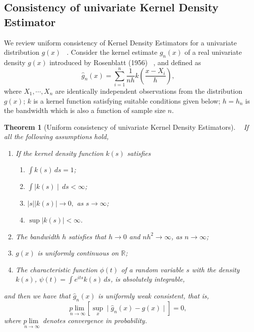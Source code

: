 \documentclass{article}
\newtheorem{theorem}{Theorem}[section]
\begin{document}
\begin{appendices}
\subsection{Consistency of univariate Kernel Density Estimator }
We review uniform consistency of Kernel Density Estimators for a univariate distribution $g(x)$ ~\cite{Silverman1978a,Pagan1999}. Consider the kernel estimate $\widehat{g}_n(x)$ of a real univariate density $g(x)$ introduced by Rosenblatt (1956) ~\cite{Silverman1978a,Pagan1999},  and defined as 
$$\widehat{g}_n(x) = \sum_{i=1}^{n} \frac{1}{nh} k\left( \frac{x-X_i}{h}\right),$$
where $X_1, \cdots, X_n$ are identically independent observations from the  distribution $g(x)$; $k$ is a kernel function satisfying suitable conditions given below; $h = h_n$ is the bandwidth which is also a function of sample size $n$.
\begin{theorem}[Uniform consistency of univariate Kernel Density Estimators]~\cite{Pagan1999,Silverman1978a}
	If all the following assumptions hold,
	\begin{enumerate}
		\item If the kernel density function $k(s)$ satisfies
		\begin{enumerate}
			\item $\int k(s)\,ds=1$;
			\item $\int \mid k(s) \mid \,ds<\infty$;
			\item $\left|s\right|\left|k(s)\right| \to 0,$ as $s \to \infty$;
			\item $\sup\left|k(s)\right|<\infty$.
		\end{enumerate}
		\item The bandwidth $h$ satisfies that $h \to 0$ and $nh^2 \to \infty$, as $n \to \infty$;
		\item $g(x)$ is uniformly continuous on $\mathbb{R}$;
		\item The characteristic function $\phi(t)$ of a random variable $s$ with the density $k(s)$,  $\psi(t) = \int e^{its} k(s)\,ds$, is absolutely integrable,
	\end{enumerate}
	and then we have that $\widehat{g}_n(x)$ is uniformly weak consistent, that is, 
	$$\underset{n \to \infty}{p\lim} \left[\underset{x}{\sup} \mid \widehat{g}_n(x) - g(x) \mid  \right] = 0,$$
	where $\underset{n \to \infty}{p\lim}$ denotes convergence in probability.
\end{theorem} 

\end{appendices}
\end{document}
